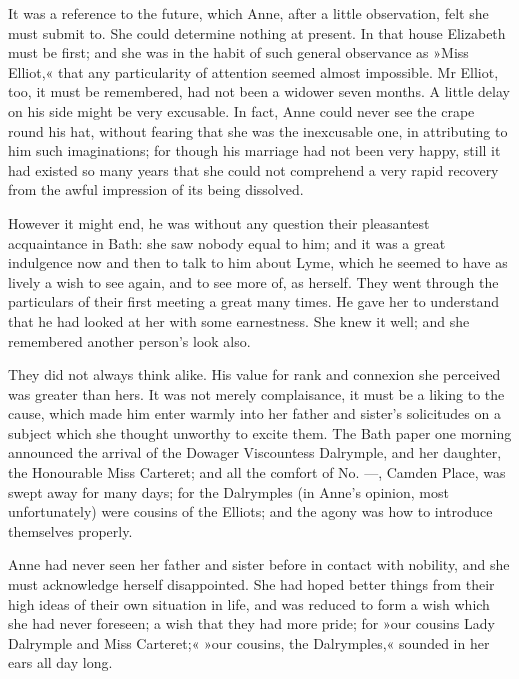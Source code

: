 It was a reference to the future, which Anne, after a little observation, felt she must submit to. She could determine nothing at present. In that house Elizabeth must be first; and she was in the habit of such general observance as »Miss Elliot,« that any particularity of attention seemed almost impossible. Mr Elliot, too, it must be remembered, had not been a widower seven months. A little delay on his side might be very excusable. In fact, Anne could never see the crape round his hat, without fearing that she was the inexcusable one, in attributing to him such imaginations; for though his marriage had not been very happy, still it had existed so many years that she could not comprehend a very rapid recovery from the awful impression of its being dissolved.

However it might end, he was without any question their pleasantest acquaintance in Bath: she saw nobody equal to him; and it was a great indulgence now and then to talk to him about Lyme, which he seemed to have as lively a wish to see again, and to see more of, as herself. They went through the particulars of their first meeting a great many times. He gave her to understand that he had looked at her with some earnestness. She knew it well; and she remembered another person's look also.

They did not always think alike. His value for rank and connexion she perceived was greater than hers. It was not merely complaisance, it must be a liking to the cause, which made him enter warmly into her father and sister's solicitudes on a subject which she thought unworthy to excite them. The Bath paper one morning announced the arrival of the Dowager Viscountess Dalrymple, and her daughter, the Honourable Miss Carteret; and all the comfort of No. —, Camden Place, was swept away for many days; for the Dalrymples (in Anne's opinion, most unfortunately) were cousins of the Elliots; and the agony was how to introduce themselves properly.

Anne had never seen her father and sister before in contact with nobility, and she must acknowledge herself disappointed. She had hoped better things from their high ideas of their own situation in life, and was reduced to form a wish which she had never foreseen; a wish that they had more pride; for »our cousins Lady Dalrymple and Miss Carteret;« »our cousins, the Dalrymples,« sounded in her ears all day long.

